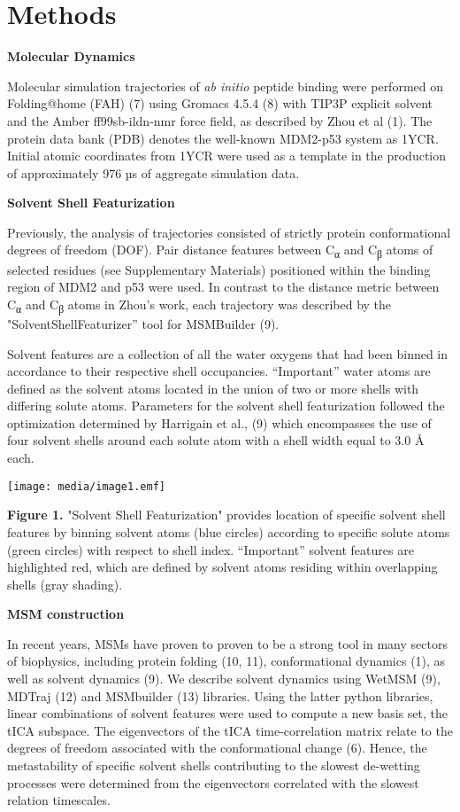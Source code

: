 
\section{Methods}

\textbf{Molecular Dynamics}

Molecular simulation trajectories of \emph{ab initio} peptide binding
were performed on Folding@home (FAH) (7) using Gromacs 4.5.4 (8) with
TIP3P explicit solvent and the Amber ff99sb-ildn-nmr force field, as
described by Zhou et al (1). The protein data bank (PDB) denotes the
well-known MDM2-p53 system as 1YCR. Initial atomic coordinates from 1YCR
were used as a template in the production of approximately 976 µs of
aggregate simulation data.

\textbf{Solvent Shell Featurization}

Previously, the analysis of trajectories consisted of strictly protein
conformational degrees of freedom (DOF). Pair distance features between
C\textsubscript{α} and C\textsubscript{β} atoms of selected residues
(see Supplementary Materials) positioned within the binding region of
MDM2 and p53 were used. In contrast to the distance metric between
C\textsubscript{α} and C\textsubscript{β} atoms in Zhou's work, each
trajectory was described by the "SolventShellFeaturizer'' tool for
MSMBuilder (9).

Solvent features are a collection of all the water oxygens that had been
binned in accordance to their respective shell occupancies.
``Important'' water atoms are defined as the solvent atoms located in
the union of two or more shells with differing solute atoms. Parameters
for the solvent shell featurization followed the optimization determined
by Harrigain et al., (9) which encompasses the use of four solvent
shells around each solute atom with a shell width equal to 3.0 Å each.

\texttt{[image: media/image1.emf]}

\textbf{Figure 1.} "Solvent Shell Featurization" provides location of
specific solvent shell features by binning solvent atoms (blue circles)
according to specific solute atoms (green circles) with respect to shell
index. ``Important'' solvent features are highlighted red, which are
defined by solvent atoms residing within overlapping shells (gray
shading).

\textbf{MSM construction}

In recent years, MSMs have proven to proven to be a strong tool in many
sectors of biophysics, including protein folding (10, 11),
conformational dynamics (1), as well as solvent dynamics (9). We
describe solvent dynamics using WetMSM (9), MDTraj (12) and MSMbuilder
(13) libraries. Using the latter python libraries, linear combinations
of solvent features were used to compute a new basis set, the tICA
subspace. The eigenvectors of the tICA time-correlation matrix relate to
the degrees of freedom associated with the conformational change (6).
Hence, the metastability of specific solvent shells contributing to the
slowest de-wetting processes were determined from the eigenvectors
correlated with the slowest relation timescales.

